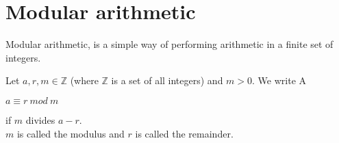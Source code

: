 \section{Modular arithmetic}
Modular arithmetic, is a simple way of performing arithmetic in a finite set of integers.

\begin{defi}
Let \begin{math} a, r,m \in  \mathbb{Z}\end{math} (where \begin{math} \mathbb{Z}\end{math} is a set of all integers) and \begin{math} m > 0\end{math}. We write A 
\begin{center} \begin{math} a \equiv r \ mod \ m\end{math} \end{center}
if \begin{math}m \end{math} divides \begin{math} a - r \end{math}.\\
\begin{math}m \end{math} is called the modulus and \begin{math}r \end{math} is called the remainder.
\end{defi}

